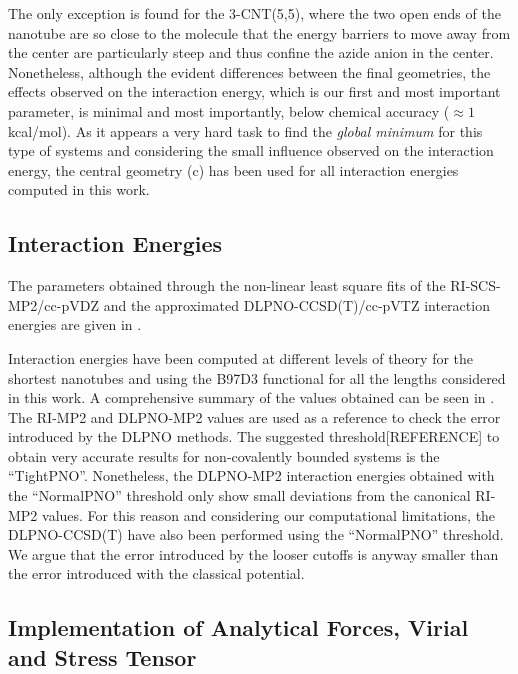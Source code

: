 \documentclass[utf8]{article}
\begin{document}
The only exception is found for the 3-CNT(5,5), where the two open ends of the nanotube are so close to the \ntm molecule that the energy barriers to move away from the center are particularly steep and thus confine the azide anion in the center.\\
Nonetheless, although the evident differences between the final geometries, the effects observed on the interaction energy, which is our first and most important parameter, is minimal and most importantly, below chemical accuracy ($\approx 1$ kcal/mol).
As it appears a very hard task to find the \emph{global minimum} for this type of systems and considering the small influence observed on the interaction energy, the central geometry (c) has been used for all interaction energies computed in this work.

\subsection{Interaction Energies}
The parameters obtained through the non-linear least square fits of the RI-SCS-MP2/cc-pVDZ and the approximated DLPNO-CCSD(T)/cc-pVTZ interaction energies are given in .

Interaction energies have been computed at different levels of theory for the shortest nanotubes and using the B97D3 functional for all the lengths considered in this work. A comprehensive summary of the values obtained can be seen in .\\
The RI-MP2 and DLPNO-MP2 values are used as a reference to check the error introduced by the DLPNO methods.
The suggested threshold[REFERENCE] to obtain very accurate results for non-covalently bounded systems is the ``TightPNO''. Nonetheless, the DLPNO-MP2 interaction energies obtained with the ``NormalPNO'' threshold only show small deviations from the canonical RI-MP2 values. For this reason and considering our computational limitations, the DLPNO-CCSD(T) have also been performed using the ``NormalPNO'' threshold.
We argue that the error introduced by the looser cutoffs is anyway smaller than the error introduced with the classical potential.

\subsection{Implementation of Analytical Forces, Virial and Stress Tensor}
\end{document}
